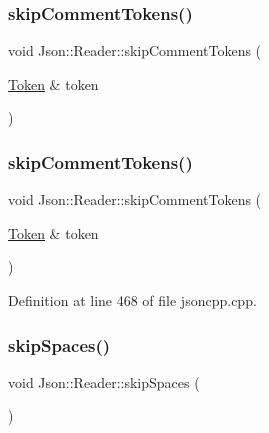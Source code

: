 \subsubsection{\texorpdfstring{skip\+Comment\+Tokens()}{skipCommentTokens()}\hspace{0.1cm}{\footnotesize\ttfamily [1/2]}}
{\footnotesize\ttfamily void Json\+::\+Reader\+::skip\+Comment\+Tokens (\begin{DoxyParamCaption}\item[{\hyperlink{class_json_1_1_reader_1_1_token}{Token} \&}]{token }\end{DoxyParamCaption})\hspace{0.3cm}{\ttfamily [private]}}

\hypertarget{class_json_1_1_reader_a22e677ef400d8223f27e631b4cd4b821}{}\label{class_json_1_1_reader_a22e677ef400d8223f27e631b4cd4b821} 
\subsubsection{\texorpdfstring{skip\+Comment\+Tokens()}{skipCommentTokens()}\hspace{0.1cm}{\footnotesize\ttfamily [2/2]}}
{\footnotesize\ttfamily void Json\+::\+Reader\+::skip\+Comment\+Tokens (\begin{DoxyParamCaption}\item[{\hyperlink{class_json_1_1_reader_1_1_token}{Token} \&}]{token }\end{DoxyParamCaption})\hspace{0.3cm}{\ttfamily [private]}}



Definition at line 468 of file jsoncpp.\+cpp.

\hypertarget{class_json_1_1_reader_a40d0f69d15aeb2d52ff78d794f5ab8b2}{}\label{class_json_1_1_reader_a40d0f69d15aeb2d52ff78d794f5ab8b2} 
\subsubsection{\texorpdfstring{skip\+Spaces()}{skipSpaces()}\hspace{0.1cm}{\footnotesize\ttfamily [1/2]}}
{\footnotesize\ttfamily void Json\+::\+Reader\+::skip\+Spaces (\begin{DoxyParamCaption}{ }\end{DoxyParamCaption})\hspace{0.3cm}{\ttfamily [private]}}

